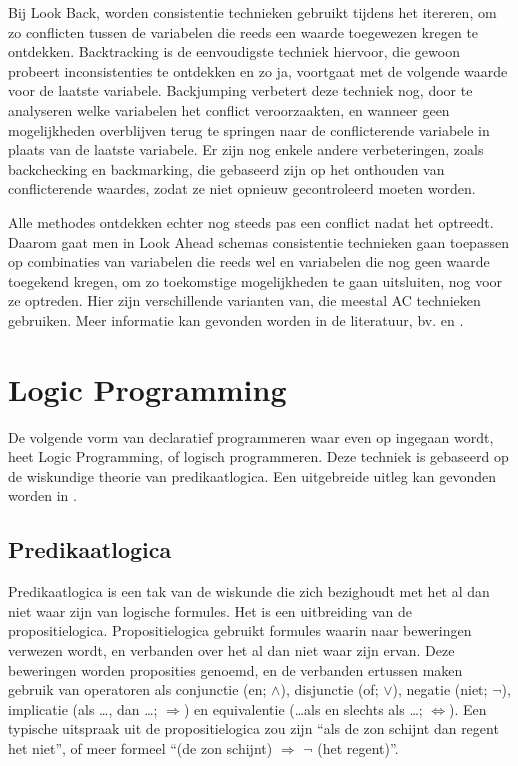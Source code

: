 Bij Look Back, worden consistentie technieken gebruikt tijdens het itereren, om zo conflicten tussen de variabelen die reeds een waarde toegewezen kregen te ontdekken. Backtracking is de eenvoudigste techniek hiervoor, die gewoon probeert inconsistenties te ontdekken en zo ja, voortgaat met de volgende waarde voor de laatste variabele. Backjumping verbetert deze techniek nog, door te analyseren welke variabelen het conflict veroorzaakten, en wanneer geen mogelijkheden overblijven terug te springen naar de conflicterende variabele in plaats van de laatste variabele. Er zijn nog enkele andere verbeteringen, zoals backchecking en backmarking, die gebaseerd zijn op het onthouden van conflicterende waardes, zodat ze niet opnieuw gecontroleerd moeten worden.

Alle methodes ontdekken echter nog steeds pas een conflict nadat het optreedt. Daarom gaat men in Look Ahead schemas consistentie technieken gaan toepassen op combinaties van variabelen die reeds wel en variabelen die nog geen waarde toegekend kregen, om zo toekomstige mogelijkheden te gaan uitsluiten, nog voor ze optreden. Hier zijn verschillende varianten van, die meestal AC technieken gebruiken. Meer informatie kan gevonden worden in de literatuur, bv. \cite{bartak01} en \cite{bartak99constraint}.

\section{Logic Programming}

De volgende vorm van declaratief programmeren waar even op ingegaan wordt, heet Logic Programming, of logisch programmeren. Deze techniek is gebaseerd op de wiskundige theorie van predikaatlogica. Een uitgebreide uitleg kan gevonden worden in \cite{introlp}.

\subsection{Predikaatlogica}

Predikaatlogica is een tak van de wiskunde die zich bezighoudt met het al dan niet waar zijn van logische formules. Het is een uitbreiding van de propositielogica. Propositielogica gebruikt formules waarin naar beweringen verwezen wordt, en verbanden over het al dan niet waar zijn ervan. Deze beweringen worden proposities genoemd, en de verbanden ertussen maken gebruik van operatoren als conjunctie (en; $\land$), disjunctie (of; $\lor$), negatie (niet; $\lnot$), implicatie (als \ldots, dan \ldots; $\Rightarrow$) en equivalentie (\ldots als en slechts als \ldots; $\Leftrightarrow$). Een typische uitspraak uit de propositielogica zou zijn ``als de zon schijnt dan regent het niet'', of meer formeel ``(de zon schijnt) $\Rightarrow$ $\lnot$ (het regent)''.

